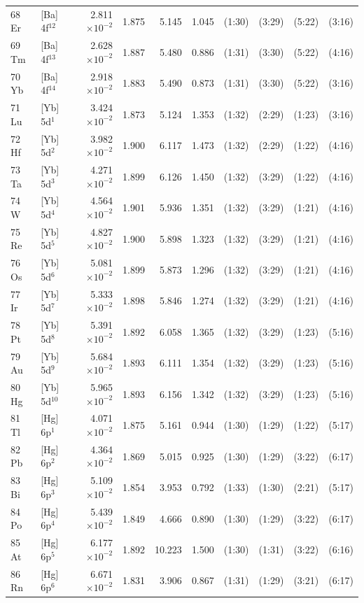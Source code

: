 \documentclass[12pt]{report}
\begin{document}
\begin{longtable}{l l r r r r r r r r}
68 Er		&	[Ba] 4f$^{12}$	&	2.811$\times10^{-2}$	&	1.875	&	5.145	&	1.045	&	(1:30)	&	 (3:29)	&	 (5:22)	&	 (3:16)\\
69 Tm		&	[Ba] 4f$^{13}$	&	2.628$\times10^{-2}$	&	1.887	&	5.480	&	0.886	&	(1:31)	&	 (3:30)	&	 (5:22)	&	 (4:16)\\
70 Yb		&	[Ba] 4f$^{14}$	&	2.918$\times10^{-2}$	&	1.883	&	5.490	&	0.873	&	(1:31)	&	 (3:30)	&	 (5:22)	&	 (3:16)\\
71 Lu		&	[Yb] 5d$^{1}$	&	3.424$\times10^{-2}$	&	1.873	&	5.124	&	1.353	&	(1:32)	&	 (2:29)	&	 (1:23)	&	 (3:16)\\
72 Hf		&	[Yb] 5d$^{2}$	&	3.982$\times10^{-2}$	&	1.900	&	6.117	&	1.473	&	(1:32)	&	 (2:29)	&	 (1:22)	&	 (4:16)\\
73 Ta		&	[Yb] 5d$^{3}$	&	4.271$\times10^{-2}$	&	1.899	&	6.126	&	1.450	&	(1:32)	&	 (3:29)	&	 (1:22)	&	 (4:16)\\
74 W			&	[Yb] 5d$^{4}$	&	4.564$\times10^{-2}$	&	1.901	&	5.936	&	1.351	&	(1:32)	&	 (3:29)	&	 (1:21)	&	 (4:16)\\
75 Re		&	[Yb] 5d$^{5}$	&	4.827$\times10^{-2}$	&	1.900	&	5.898	&	1.323	&	(1:32)	&	 (3:29)	&	 (1:21)	&	 (4:16)\\
76 Os		&	[Yb] 5d$^{6}$	&	5.081$\times10^{-2}$	&	1.899	&	5.873	&	1.296	&	(1:32)	&	 (3:29)	&	 (1:21)	&	 (4:16)\\
77 Ir		 	&	[Yb] 5d$^{7}$	&	5.333$\times10^{-2}$	&	1.898	&	5.846	&	1.274	&	(1:32)	&	 (3:29)	&	 (1:21)	&	 (4:16)\\
78 Pt		 	&	[Yb] 5d$^{8}$	&	5.391$\times10^{-2}$	&	1.892	&	6.058	&	1.365	&	(1:32)	&	 (3:29)	&	 (1:23)	&	 (5:16)\\
79 Au		&	[Yb] 5d$^{9}$	&	5.684$\times10^{-2}$	&	1.893	&	6.111	&	1.354	&	(1:32)	&	 (3:29)	&	 (1:23)	&	 (5:16)\\
80 Hg	 	&	[Yb] 5d$^{10}$	&	5.965$\times10^{-2}$	&	1.893	&	6.156	&	1.342	&	(1:32)	&	 (3:29)	&	 (1:23)	&	 (5:16)\\
81 Tl		 	&	[Hg] 6p$^{1}$	&	4.071$\times10^{-2}$	&	1.875	&	5.161	&	0.944	&	(1:30)	&	 (1:29)	&	 (1:22)	&	 (5:17)\\
82 Pb		&	[Hg] 6p$^{2}$	&	4.364$\times10^{-2}$	&	1.869	&	5.015	&	0.925	&	(1:30)	&	 (1:29)	&	 (3:22)	&	 (6:17)\\
83 Bi		 	&	[Hg] 6p$^{3}$	&	5.109$\times10^{-2}$	&	1.854	&	3.953	&	0.792	&	(1:33)	&	 (1:30)	&	 (2:21)	&	 (5:17)\\
84 Po		&	[Hg] 6p$^{4}$	&	5.439$\times10^{-2}$	&	1.849	&	4.666	&	0.890	&	(1:30)	&	 (1:29)	&	 (3:22)	&	 (6:17)\\
85 At		 	&	[Hg] 6p$^{5}$	&	6.177$\times10^{-2}$	&	1.892	&	10.223	&	1.500	&	(1:30)	&	 (1:31)	&	 (3:22)	&	 (6:16)\\
86 Rn	 	&	[Hg] 6p$^{6}$	&	6.671$\times10^{-2}$	&	1.831	&	3.906	&	0.867	&	(1:31)	&	 (1:29)	&	 (3:21)	&	 (6:17)\\
\bottomrule
\end{longtable}
\end{document}
